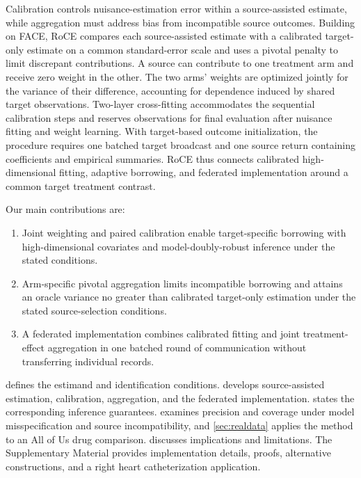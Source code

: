 \documentclass[12pt]{article}
\begin{document}
Calibration controls nuisance-estimation error within a source-assisted estimate, while aggregation must address bias from incompatible source outcomes. Building on FACE, RoCE compares each source-assisted estimate with a calibrated target-only estimate on a common standard-error scale and uses a pivotal penalty to limit discrepant contributions. A source can contribute to one treatment arm and receive zero weight in the other. The two arms' weights are optimized jointly for the variance of their difference, accounting for dependence induced by shared target observations. Two-layer cross-fitting accommodates the sequential calibration steps and reserves observations for final evaluation after nuisance fitting and weight learning. With target-based outcome initialization, the procedure requires one batched target broadcast and one source return containing coefficients and empirical summaries. RoCE thus connects calibrated high-dimensional fitting, adaptive borrowing, and federated implementation around a common target treatment contrast.

Our main contributions are:
\begin{enumerate}[label=(\roman*),leftmargin=*,itemsep=0pt]
\item Joint weighting and paired calibration enable target-specific borrowing with high-dimensional covariates and model-doubly-robust inference under the stated conditions.
\item Arm-specific pivotal aggregation limits incompatible borrowing and attains an oracle variance no greater than calibrated target-only estimation under the stated source-selection conditions.
\item A federated implementation combines calibrated fitting and joint treatment-effect aggregation in one batched round of communication without transferring individual records.
\end{enumerate}

 defines the estimand and identification conditions.  develops source-assisted estimation, calibration, aggregation, and the federated implementation.  states the corresponding inference guarantees.  examines precision and coverage under model misspecification and source incompatibility, and \cref{sec:realdata} applies the method to an All of Us drug comparison.  discusses implications and limitations. The Supplementary Material provides implementation details, proofs, alternative constructions, and a right heart catheterization application.
\end{document}

